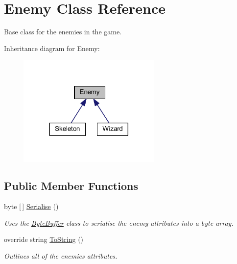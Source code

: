 \hypertarget{class_enemy}{}\section{Enemy Class Reference}
\label{class_enemy}


Base class for the enemies in the game.  




Inheritance diagram for Enemy\+:\nopagebreak
\begin{figure}[H]
\begin{center}
\leavevmode
\includegraphics[width=200pt]{class_enemy__inherit__graph}
\end{center}
\end{figure}
\subsection*{Public Member Functions}
\begin{DoxyCompactItemize}
\item 
byte \mbox{[}$\,$\mbox{]} \mbox{\hyperlink{class_enemy_aa2dcacb6e604b61d81603f5a9ca7599b}{Serialise}} ()
\begin{DoxyCompactList}\small\item\em Uses the \mbox{\hyperlink{class_byte_buffer}{Byte\+Buffer}} class to serialise the enemy attributes into a byte array. \end{DoxyCompactList}\item 
override string \mbox{\hyperlink{class_enemy_a9e96feb153ffddecf46557ed57059289}{To\+String}} ()
\begin{DoxyCompactList}\small\item\em Outlines all of the enemies attributes. \end{DoxyCompactList}\end{DoxyCompactItemize}
